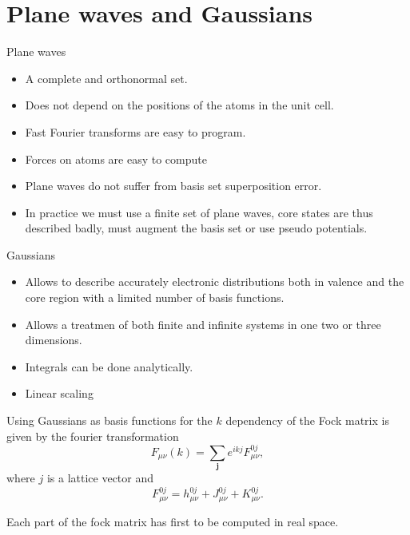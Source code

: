 \documentclass[12pt,a4paper,english]{beamer}
\newcommand{\mbf}{ \mathbf }
\begin{document}
\section{Plane waves and Gaussians}
\begin{frame}
  Plane waves
  \begin{itemize}
	\item A complete and orthonormal set.
	\item Does not depend on the positions of the atoms in the unit cell.
	\item Fast Fourier transforms are easy to program.
	\item Forces on atoms are easy to compute
	\item Plane waves do not suffer from basis set superposition error.
	\item In practice we must use a finite set of plane waves, core states are thus described badly, must augment the basis set or use pseudo potentials.
  \end{itemize}
\end{frame}
\begin{frame}
  Gaussians
  \begin{itemize}
	\item Allows to describe accurately electronic distributions both in valence and the core region with a limited number of basis functions.
	\item Allows a treatmen of both finite and infinite systems in one two or three dimensions.
	\item Integrals can be done analytically.
	\item Linear scaling
  \end{itemize}
\end{frame}

\begin{frame}

  Using Gaussians as basis functions for the $k$ dependency of the Fock matrix is given by the fourier transformation
  \begin{equation}
	F_{\mu\nu}(k)=\sum_{\mbf j}e^{ikj}F_{\mu\nu}^{0j},
	   \label{hfbleq:totmatx2}
	 \end{equation}
	 where $j$ is a lattice vector and
	 \begin{equation}
	   F_{\mu\nu}^{0j}=h_{\mu\nu}^{0j}+J_{\mu\nu}^{0j}+K_{\mu\nu}^{0j}.
	 \end{equation}

	 Each part of the fock matrix has first to be computed in real space.

\end{frame}
\end{document}
